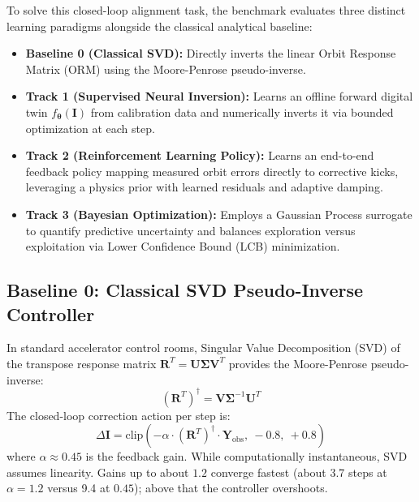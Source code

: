 \documentclass[11pt,a4paper]{article}
\begin{document}
To solve this closed-loop alignment task, the benchmark evaluates three distinct learning paradigms alongside the classical analytical baseline:
\begin{itemize}
    \item \textbf{Baseline 0 (Classical SVD):} Directly inverts the linear Orbit Response Matrix (ORM) using the Moore-Penrose pseudo-inverse.
    \item \textbf{Track 1 (Supervised Neural Inversion):} Learns an offline forward digital twin $f_{\boldsymbol{\theta}}(\mathbf{I})$ from calibration data and numerically inverts it via bounded optimization at each step.
    \item \textbf{Track 2 (Reinforcement Learning Policy):} Learns an end-to-end feedback policy mapping measured orbit errors directly to corrective kicks, leveraging a physics prior with learned residuals and adaptive damping.
    \item \textbf{Track 3 (Bayesian Optimization):} Employs a Gaussian Process surrogate to quantify predictive uncertainty and balances exploration versus exploitation via Lower Confidence Bound (LCB) minimization.
\end{itemize}

\subsection{Baseline 0: Classical SVD Pseudo-Inverse Controller}
In standard accelerator control rooms, Singular Value Decomposition (SVD) of the transpose response matrix $\mathbf{R}^T = \mathbf{U} \boldsymbol{\Sigma} \mathbf{V}^T$ provides the Moore-Penrose pseudo-inverse:
\begin{equation}
    (\mathbf{R}^T)^\dagger = \mathbf{V} \boldsymbol{\Sigma}^{-1} \mathbf{U}^T
\end{equation}
The closed-loop correction action per step is:
\begin{equation}
    \Delta \mathbf{I} = \text{clip}\left( - \alpha \cdot (\mathbf{R}^T)^\dagger \cdot \mathbf{Y}_{\text{obs}}, \ -0.8, \ +0.8 \right)
\end{equation}
where $\alpha \approx 0.45$ is the feedback gain.
While computationally instantaneous, SVD assumes linearity. Gains up to about $1.2$ converge fastest (about 3.7 steps at $\alpha = 1.2$ versus 9.4 at $0.45$); above that the controller overshoots.
\end{document}
